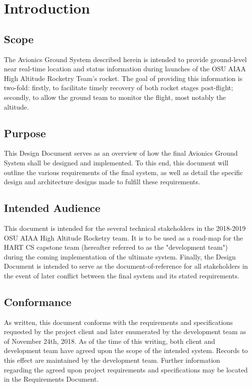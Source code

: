 \documentclass[journal,10pt,onecolumn,compsoc]{IEEEtran}
\begin{document}
\setlength{\parskip}{\baselineskip} 
\section{Introduction}

	\subsection{Scope}
		\noindent The Avionics Ground System described herein is intended to provide ground-level near real-time location and status information during launches of the OSU AIAA High Altitude Rocketry Team's rocket.
		The goal of providing this information is two-fold: firstly, to facilitate timely recovery of both rocket stages post-flight; secondly, to allow the ground team to monitor the flight, most notably the altitude.

	\subsection{Purpose}
		\noindent This Design Document serves as an overview of how the final Avionics Ground System shall be designed and implemented.
		To this end, this document will outline the various requirements of the final system, as well as detail the specific design and architecture designs made to fulfill these requirements.

	\subsection{Intended Audience}
		\noindent This document is intended for the several technical stakeholders in the 2018-2019 OSU AIAA High Altitude Rocketry team.
		It is to be used as a road-map for the HART CS capstone team (hereafter referred to as the "development team") during the coming implementation of the ultimate system.
		Finally, the Design Document is intended to serve as the document-of-reference for all stakeholders in the event of later conflict between the final system and its stated requirements.

	\subsection{Conformance}
		\noindent As written, this document conforms with the requirements and specifications requested by the project client and later enumerated by the development team as of November 24th, 2018.
		As of the time of this writing, both client and development team have agreed upon the scope of the intended system.
		Records to this effect are maintained by the development team.
		Further information regarding the agreed upon project requirements and specifications may be located in the Requirements Document.
\end{document}

